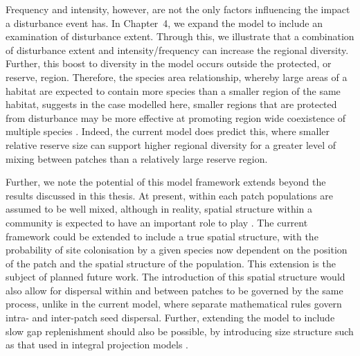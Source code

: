 Frequency and intensity, however, are not the only factors influencing the impact a disturbance event has. In Chapter~4, we expand the model to include an examination of disturbance extent. Through this, we illustrate that a combination of disturbance extent and intensity/frequency can increase the regional diversity. Further, this boost to diversity in the model occurs outside the protected, or reserve, region. Therefore, the species area relationship, whereby large areas of a habitat are expected to contain more species than a smaller region of the same habitat, suggests in the case modelled here, smaller regions that are protected from disturbance may be more effective at promoting region wide coexistence of multiple species \citep[e.g.][]{arrhenius1921species,gleason1922relation,connor1979statistics}. Indeed, the current model does predict this, where smaller relative reserve size can support higher regional diversity for a greater level of mixing between patches than a relatively large reserve region.

Further, we note the potential of this model framework extends beyond the results discussed in this thesis. At present, within each patch populations are assumed to be well mixed, although in reality, spatial structure within a community is expected to have an important role to play \citep{murrell2010does}. The current framework could be extended to include a true spatial structure, with the probability of site colonisation by a given species now dependent on the position of the patch and the spatial structure of the population. This extension  is the subject of planned future work. The introduction of this spatial structure would also allow for dispersal within and between patches to be governed by the same process, unlike in the current model, where separate mathematical rules govern intra- and inter-patch seed dispersal. Further, extending the model to include slow gap replenishment should also be possible, by introducing size structure such as that used in integral projection models \citep[e.g.][]{zuidema2010integral,rees2009integral}.

